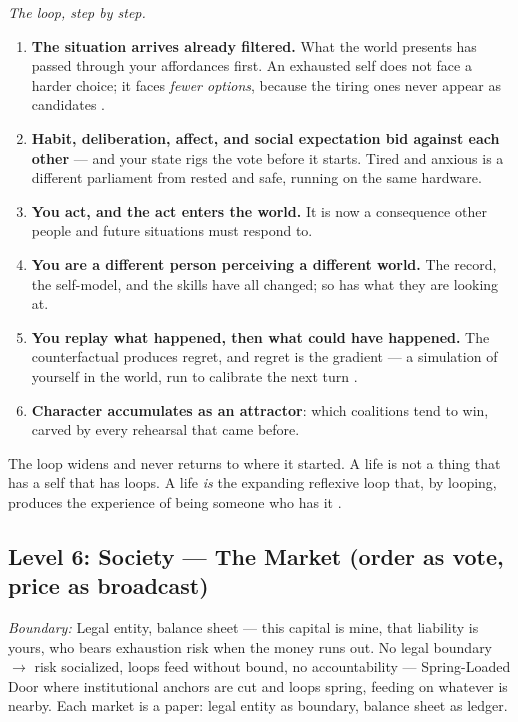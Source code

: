 \documentclass[11pt]{article}
\begin{document}
{\textit{The loop, step by step.}
\begin{enumerate}\itemsep2pt
\item \textbf{The situation arrives already filtered.} What the world
presents has passed through your affordances first. An exhausted self does
not face a harder choice; it faces \emph{fewer options}, because the
tiring ones never appear as candidates \citep{seth2021}.
\item \textbf{Habit, deliberation, affect, and social expectation bid
against each other} --- and your state rigs the vote before it starts.
Tired and anxious is a different parliament from rested and safe, running
on the same hardware.
\item \textbf{You act, and the act enters the world.} It is now a
consequence other people and future situations must respond to.
\item \textbf{You are a different person perceiving a different world.}
The record, the self-model, and the skills have all changed; so has what
they are looking at.
\item \textbf{You replay what happened, then what could have happened.}
The counterfactual produces regret, and regret is the gradient --- a
simulation of yourself in the world, run to calibrate the next turn
\citep{tononi2014,sofroniew2026}.
\item \textbf{Character accumulates as an attractor}: which coalitions
tend to win, carved by every rehearsal that came before.
\end{enumerate}

The loop widens and never returns to where it started. A life is not a
thing that has a self that has loops. A life \emph{is} the expanding
reflexive loop that, by looping, produces the experience of being someone
who has it \citep{maturana1980}.

\subsection{Level 6: Society --- The Market (order as vote, price as broadcast)}

\textit{Boundary:} Legal entity, balance sheet --- this capital is mine, that liability is yours, who bears exhaustion risk when the money runs out. No legal boundary $\to$\allowbreak{} risk socialized, loops feed without bound, no accountability --- Spring-Loaded Door where institutional anchors are cut and loops spring, feeding on whatever is nearby. Each market is a paper: legal entity as boundary, balance sheet as ledger.

}
\end{document}
